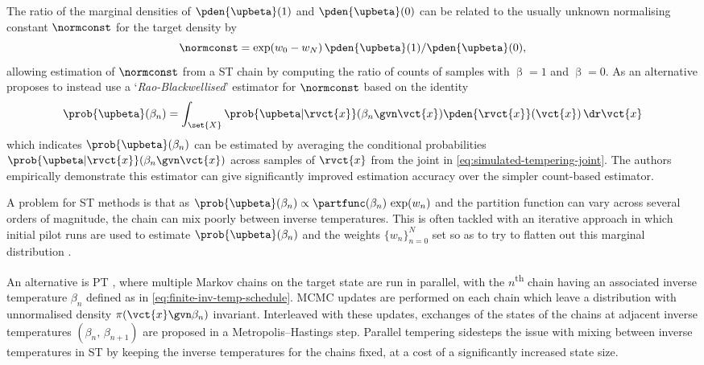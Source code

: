 The ratio of the marginal densities of $\pden{\upbeta}(1)$ and $\pden{\upbeta}(0)$ can be related to the usually unknown normalising constant $\normconst$ for the target density by
\begin{equation}\label{eq:st-marginal-ratio}
\normconst = \exp(w_0 - w_N) \, \pden{\upbeta}(1)/\pden{\upbeta}(0),
\end{equation}
allowing estimation of $\normconst$ from a \ac{ST} chain by computing the ratio of counts of samples with $\upbeta=1$ and $\upbeta=0$. As an alternative \cite{carlson2016partition} proposes to instead use a `\emph{Rao-Blackwellised}' estimator for $\normconst$ based on the identity
\begin{equation}\label{eq:rao-blackwell-tempered-sampling}
  \prob{\upbeta}(\beta_n) = 
  \int_{\set{X}} 
    \prob{\upbeta|\rvct{x}}(\beta_n\gvn\vct{x})
    \pden{\rvct{x}}(\vct{x})
  \,\dr\vct{x} 
\end{equation}
which indicates $\prob{\upbeta}(\beta_n)$ can be estimated by averaging the conditional probabilities $\prob{\upbeta|\rvct{x}}(\beta_n\gvn\vct{x})$ across samples of $\rvct{x}$ from the joint in \eqref{eq:simulated-tempering-joint}. The authors empirically demonstrate this estimator can give significantly improved estimation accuracy over the simpler count-based estimator.

A problem for \ac{ST} methods is that as  $\prob{\upbeta}(\beta_n) \propto \partfunc(\beta_n) \,\exp( w_n)$ and the partition function can vary across several orders of magnitude, the chain can mix poorly between inverse temperatures. This is often tackled with an iterative approach in which initial pilot runs are used to estimate $\prob{\upbeta}(\beta_n)$ and the weights $\lbrace w_n\rbrace_{n=0}^N$ set so as to try to flatten out this marginal distribution \cite{geyer1995annealing}.

An alternative is \ac{PT} \citep{swendsen1986replica,geyer1991markov,earl2005parallel}, where multiple Markov chains on the target state are run in parallel, with the $n$\textsuperscript{th} chain having an associated inverse temperature $\beta_n$ defined as in \eqref{eq:finite-inv-temp-schedule}. \ac{MCMC} updates are performed on each chain which leave a distribution with unnormalised density $\pi(\vct{x} \gvn \beta_n)$ invariant. Interleaved with these updates, exchanges of the states of the chains at adjacent inverse temperatures $(\beta_n,\,\beta_{n+1})$ are proposed in a Metropolis--Hastings step. Parallel tempering sidesteps the issue with mixing between inverse temperatures in \ac{ST} by keeping the inverse temperatures for the chains fixed, at a cost of a significantly increased state size.

